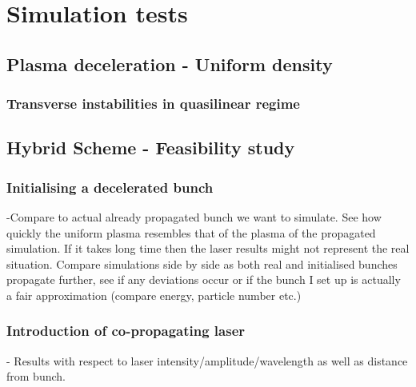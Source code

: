 \chapter{Simulation tests} %
\section{Plasma deceleration - Uniform density}
\subsection{Transverse instabilities in quasilinear regime}
\section{Hybrid Scheme - Feasibility study}
\subsection{Initialising a decelerated bunch}
-Compare to actual already propagated bunch we want to simulate. See how quickly the uniform plasma resembles that of the plasma of the propagated simulation. If it takes long time then the laser results might not represent the real situation.  Compare simulations side by side as both real and initialised bunches propagate further, see if any deviations occur or if the bunch I set up is actually a fair approximation (compare energy, particle number etc.)
\subsection{Introduction of co-propagating laser}
- Results with respect to laser intensity/amplitude/wavelength as well as distance from bunch.